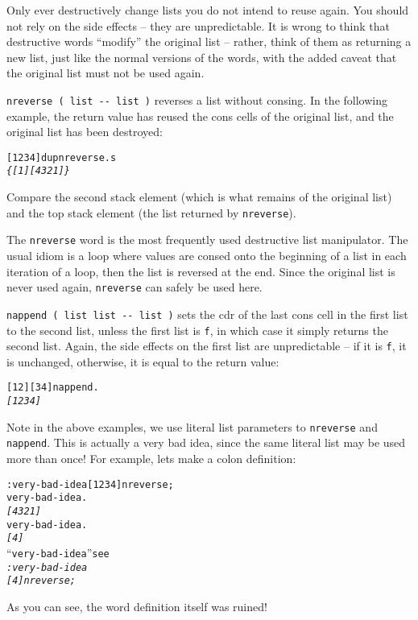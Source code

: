 \documentclass[english]{article}
\begin{document}
Only ever destructively change lists you do not intend to reuse again.
You should not rely on the side effects -- they are unpredictable.
It is wrong to think that destructive words {}``modify'' the original
list -- rather, think of them as returning a new list, just like the
normal versions of the words, with the added caveat that the original
list must not be used again.

\texttt{nreverse ( list -{}- list )} reverses a list without consing.
In the following example, the return value has reused the cons cells of
the original list, and the original list has been destroyed:

\begin{alltt}
{[} 1 2 3 4 {]} dup nreverse .s
\emph{\{ {[} 1 {]} {[} 4 3 2 1 {]} \}}
\end{alltt}
Compare the second stack element (which is what remains of the original
list) and the top stack element (the list returned by \texttt{nreverse}).

The \texttt{nreverse} word is the most frequently used destructive
list manipulator. The usual idiom is a loop where values are consed
onto the beginning of a list in each iteration of a loop, then the
list is reversed at the end. Since the original list is never used
again, \texttt{nreverse} can safely be used here.

\texttt{nappend ( list list -{}- list )} sets the cdr of the last
cons cell in the first list to the second list, unless the first list
is \texttt{f}, in which case it simply returns the second list. Again,
the side effects on the first list are unpredictable -- if it is \texttt{f},
it is unchanged, otherwise, it is equal to the return value:

\begin{alltt}
{[} 1 2 {]} {[} 3 4 {]} nappend .
\emph{{[} 1 2 3 4 {]}}
\end{alltt}
Note in the above examples, we use literal list parameters to \texttt{nreverse}
and \texttt{nappend}. This is actually a very bad idea, since the same literal
list may be used more than once! For example, lets make a colon definition:

\begin{alltt}
: very-bad-idea {[} 1 2 3 4 {]} nreverse ;
very-bad-idea .
\emph{{[} 4 3 2 1 {]}}
very-bad-idea .
\emph{{[} 4 {]}}
{}``very-bad-idea'' see
\emph{: very-bad-idea}
 \emph{   {[} 4 {]} nreverse ;}
\end{alltt}
As you can see, the word definition itself was ruined!
\end{document}
